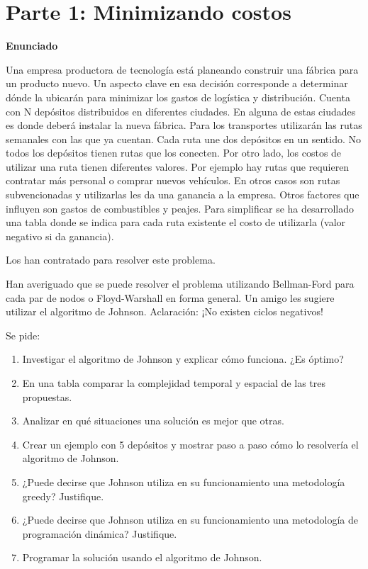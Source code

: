 \documentclass[titlepage,a4paper]{article}
\begin{document}
\newpage\section{Parte 1: Minimizando costos}\label{sec:parte1}

\textbf{Enunciado}

Una empresa productora de tecnología está planeando construir una fábrica para un
producto nuevo. Un aspecto clave en esa decisión corresponde a determinar dónde la
ubicarán para minimizar los gastos de logística y distribución. Cuenta con N depósitos
distribuidos en diferentes ciudades. En alguna de estas ciudades es donde deberá
instalar la nueva fábrica. Para los transportes utilizarán las rutas semanales con las
que ya cuentan. Cada ruta une dos depósitos en un sentido. No todos los depósitos
tienen rutas que los conecten. Por otro lado, los costos de utilizar una ruta tienen
diferentes valores. Por ejemplo hay rutas que requieren contratar más personal o
comprar nuevos vehículos. En otros casos son rutas subvencionadas y utilizarlas les
da una ganancia a la empresa. Otros factores que influyen son gastos de combustibles
y peajes. Para simplificar se ha desarrollado una tabla donde se indica para cada
ruta existente el costo de utilizarla (valor negativo si da ganancia).

Los han contratado para resolver este problema.

Han averiguado que se puede resolver el problema utilizando Bellman-Ford para cada
par de nodos o Floyd-Warshall en forma general. Un amigo les sugiere utilizar el
algoritmo de Johnson. Aclaración: ¡No existen ciclos negativos!

\noindent Se pide:

\begin{enumerate}
    \item Investigar el algoritmo de Johnson y explicar cómo funciona. ¿Es óptimo?
    \item En una tabla comparar la complejidad temporal y espacial de las tres propuestas.
    \item Analizar en qué situaciones una solución es mejor que otras.
    \item Crear un ejemplo con 5 depósitos y mostrar paso a paso cómo lo resolvería el algoritmo de Johnson.
    \item ¿Puede decirse que Johnson utiliza en su funcionamiento una metodología greedy? Justifique.
    \item ¿Puede decirse que Johnson utiliza en su funcionamiento una metodología de programación dinámica? Justifique.
    \item Programar la solución usando el algoritmo de Johnson.
\end{enumerate}
\end{document}
